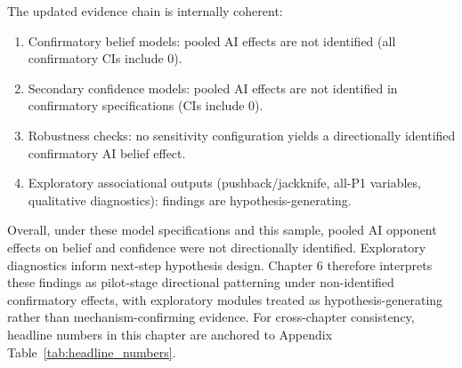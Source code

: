 The updated evidence chain is internally coherent:
\begin{enumerate}
    \item Confirmatory belief models: pooled AI effects are not identified (all confirmatory CIs include 0).
    \item Secondary confidence models: pooled AI effects are not identified in confirmatory specifications (CIs include 0).
    \item Robustness checks: no sensitivity configuration yields a directionally identified confirmatory AI belief effect.
    \item Exploratory associational outputs (pushback/jackknife, all-P1 variables,
          qualitative diagnostics): findings are hypothesis-generating.
\end{enumerate}

Overall, under these model specifications and this sample, pooled AI opponent effects on belief
and confidence were not directionally identified. Exploratory diagnostics inform
next-step hypothesis design.
Chapter 6 therefore interprets these findings as pilot-stage directional patterning
under non-identified confirmatory effects, with exploratory modules treated as
hypothesis-generating rather than mechanism-confirming evidence.
For cross-chapter consistency, headline numbers in this chapter are anchored to
Appendix Table~\ref{tab:headline_numbers}.
